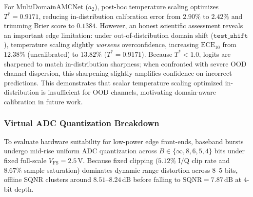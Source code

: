 For $\mathrm{MultiDomainAMCNet}$ ($a_2$), post-hoc temperature scaling optimizes $T^* = 0.9171$, reducing in-distribution calibration error from $2.90\%$ to $2.42\%$ and trimming Brier score to $0.1384$. However, an honest scientific assessment reveals an important edge limitation: under out-of-distribution domain shift ($\texttt{test\_shift}$), temperature scaling slightly \emph{worsens} overconfidence, increasing $\text{ECE}_{10}$ from $12.38\%$ (uncalibrated) to $13.82\%$ ($T^* = 0.9171$). Because $T^* < 1.0$, logits are sharpened to match in-distribution sharpness; when confronted with severe OOD channel dispersion, this sharpening slightly amplifies confidence on incorrect predictions. This demonstrates that scalar temperature scaling optimized in-distribution is insufficient for OOD channels, motivating domain-aware calibration in future work.

\subsubsection{Virtual ADC Quantization Breakdown}
To evaluate hardware suitability for low-power edge front-ends, baseband bursts undergo mid-rise uniform ADC quantization across $B \in \{\infty, 8, 6, 5, 4\}$ bits under fixed full-scale $V_{\mathrm{FS}} = 2.5\,\mathrm{V}$. Because fixed clipping ($5.12\%$ I/Q clip rate and $8.67\%$ sample saturation) dominates dynamic range distortion across $8$--$5$ bits, offline SQNR clusters around $8.51$--$8.24\,\mathrm{dB}$ before falling to $\mathrm{SQNR} = 7.87\,\mathrm{dB}$ at $4$-bit depth.

